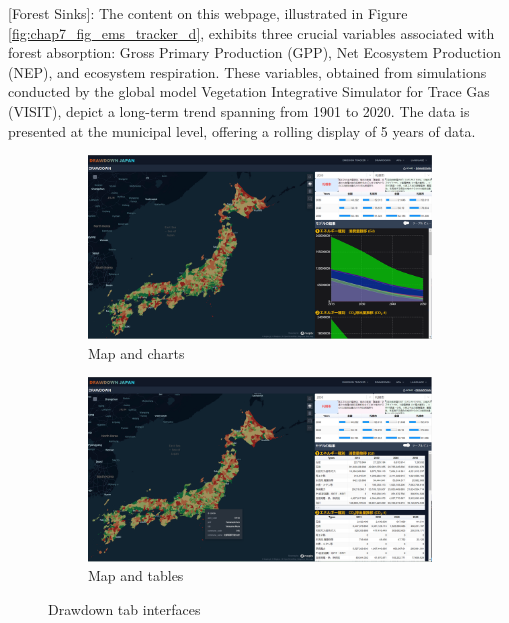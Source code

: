 [Forest Sinks]: The content on this webpage, illustrated in Figure \ref{fig:chap7_fig_ems_tracker_d}, exhibits three crucial variables associated with forest absorption: Gross Primary Production (GPP), Net Ecosystem Production (NEP), and ecosystem respiration. These variables, obtained from simulations conducted by the global model Vegetation Integrative Simulator for Trace Gas (VISIT), depict a long-term trend spanning from 1901 to 2020. The data is presented at the municipal level, offering a rolling display of 5 years of data. \par
\begin{figure}[tbh!]
  \centering
  \begin{subfigure}{.5\textwidth}
      \centering
      \includegraphics[width=.9\textwidth]{figs/chap7/drawdown1.png}
      \caption{Map and charts}
  \end{subfigure}%
  \begin{subfigure}{.5\textwidth}
      \centering
      \includegraphics[width=.9\textwidth]{figs/chap7/drawdown2.png}
      \caption{Map and tables}
  \end{subfigure}
  \caption{Drawdown tab interfaces}
  \label{fig:chap7_fig_drawdown}
\end{figure}

